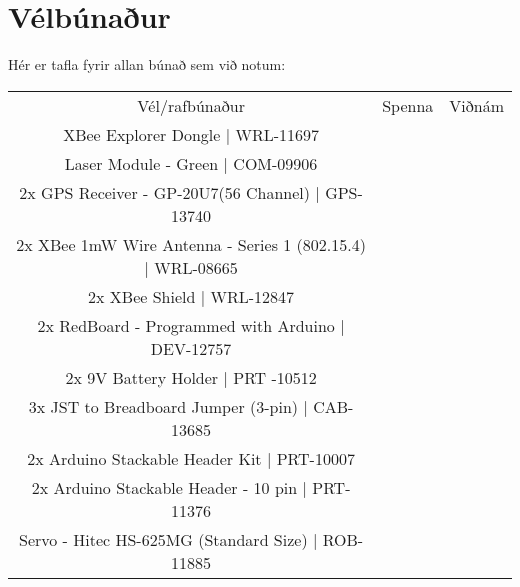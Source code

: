 ﻿\section{Vélbúnaður}
Hér er tafla fyrir allan búnað sem við notum:

\begin{center}
\begin{tabular}{ |c|c|c| } 
 \hline
 Vél/rafbúnaður &Spenna &Viðnám\\ 
 XBee Explorer Dongle | WRL-11697 \\
 Laser Module - Green | COM-09906 \\
 2x GPS Receiver - GP-20U7(56 Channel) | GPS-13740 \\
 2x XBee 1mW Wire Antenna - Series 1 (802.15.4) | WRL-08665 \\
 2x XBee Shield | WRL-12847 \\
 2x RedBoard - Programmed with Arduino | DEV-12757 \\
 2x 9V Battery Holder | PRT -10512 \\
 3x JST to Breadboard Jumper (3-pin) | CAB-13685 \\
 2x Arduino Stackable Header Kit | PRT-10007 \\
 2x Arduino Stackable Header - 10 pin | PRT-11376 \\
 Servo - Hitec HS-625MG (Standard Size) | ROB-11885 \\
 \hline
\end{tabular}
\end{center}